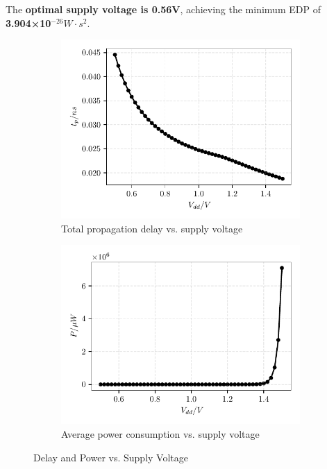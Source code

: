 \documentclass[UTF8,12pt,a4paper]{ctexart}
\begin{document}
The \textbf{optimal supply voltage is 0.56V}, achieving the minimum EDP of \textbf{3.904×10$^{-26} W \cdot s^2$}.

\begin{figure}[htbp]
    \centering
    \begin{subfigure}[b]{0.45\textwidth} %
        \centering
        \includegraphics[width=\textwidth]{Task4/tp_total_vs_volts.pdf} 
        \caption{Total propagation delay vs. supply voltage}
        \label{fig:task4_delay}
    \end{subfigure}
    \hfill %
    \begin{subfigure}[b]{0.45\textwidth}
        \centering
        \includegraphics[width=\textwidth]{Task4/power_vs_volts.pdf} 
        \caption{Average power consumption vs. supply voltage}
        \label{fig:task4_power}
    \end{subfigure}
    \caption{Delay and Power vs. Supply Voltage}
    \label{fig:task4_delay_power}
\end{figure}
\end{document}
